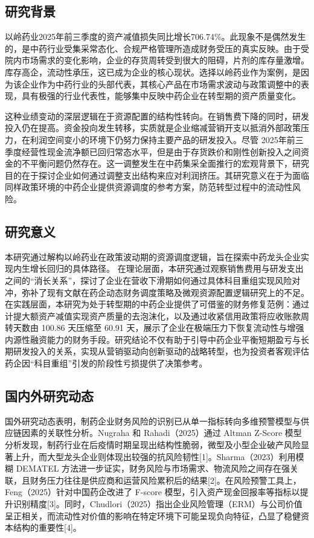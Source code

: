 \documentclass[12pt,a4paper,fontset=windows,UTF8]{ctexart}
\begin{document}
\subsection{研究背景}
以岭药业2025年前三季度的资产减值损失同比增长706.74\%。此现象不是偶然发生的，是中药行业受集采常态化、合规严格管理所造成财务受压的真实反映。由于受院内市场需求的变化影响，企业的存货周转受到很大的阻碍，片剂的库存量激增。库存高企，流动性承压，这已成为企业的核心现状。选择以岭药业作为案例，是因为该企业作为中药行业的头部代表，其核心产品在市场需求波动与政策调整中的表现，具有极强的行业代表性，能够集中反映中药企业在转型期的资产质量变化。

这种业绩变动的深层逻辑在于资源配置的结构性转向。在销售费下降的同时，研发投入仍在提高。资金投向发生转移，实质就是企业缩减营销开支以抵消外部政策压力，在利润空间变小的环境下仍努力保持主要产品的研发投入。尽管 2025年前三季度经营性现金流净额已回归常态水平，但是由于存货跌价和刚性创新投入之间资金的不平衡问题仍然存在。这一调整发生在中药集采全面推行的宏观背景下，研究目的在于探讨企业如何通过调整支出结构来应对利润挤压。其研究意义在于为面临同样政策环境的中药企业提供资源调度的参考方案，防范转型过程中的流动性风险。

\subsection{研究意义}
本研究通过解构以岭药业在政策波动期的资源调度逻辑，旨在探索中药龙头企业实现内生增长回归的具体路径。 在理论层面，本研究通过观察销售费用与研发支出之间的“消长关系”，探讨了企业在营收下滑期如何通过具体科目重组实现风险对冲，弥补了现有文献在药企动态财务调度策略及微观资源配置逻辑研究上的不足。在实践层面，本研究为处于转型期的中药企业提供了可借鉴的财务修复范例：通过计提大额资产减值实现资产质量的去泡沫化，以及通过收紧信用政策将应收账款周转天数由 100.86 天压缩至 60.91 天，展示了企业在极端压力下恢复流动性与增强内源性融资能力的财务手段。研究结论不仅有助于引导中药企业平衡短期盈亏与长期研发投入的关系，实现从营销驱动向创新驱动的战略转型，也为投资者客观评估药企因“科目重组”引发的阶段性亏损提供了决策参考。

\subsection{国内外研究动态}
国外研究动态表明，制药企业财务风险的识别已从单一指标转向多维预警模型与供应链因素的关联性分析。Nugraha 和 Rahadi（2025）通过 Altman Z-Score 模型分析发现，制药行业在后疫情时期呈现出结构性脆弱，微型及小型企业破产风险显著上升，而大型龙头企业则体现出较强的抗风险韧性[1]。Sharma（2023）利用模糊 DEMATEL 方法进一步证实，财务风险与市场需求、物流风险之间存在强关联，且财务压力往往是供应商和运营风险累积后的结果[2]。在风险预警工具上，Feng（2025）针对中国药企改进了 F-score 模型，引入资产现金回报率等指标以提升识别精度[3]。同时，Chudlori（2025）指出企业风险管理（ERM）与公司价值呈正相关，而流动性对价值的影响在特定环境下可能呈现负向特征，凸显了稳健资本结构的重要性[4]。
\end{document}
